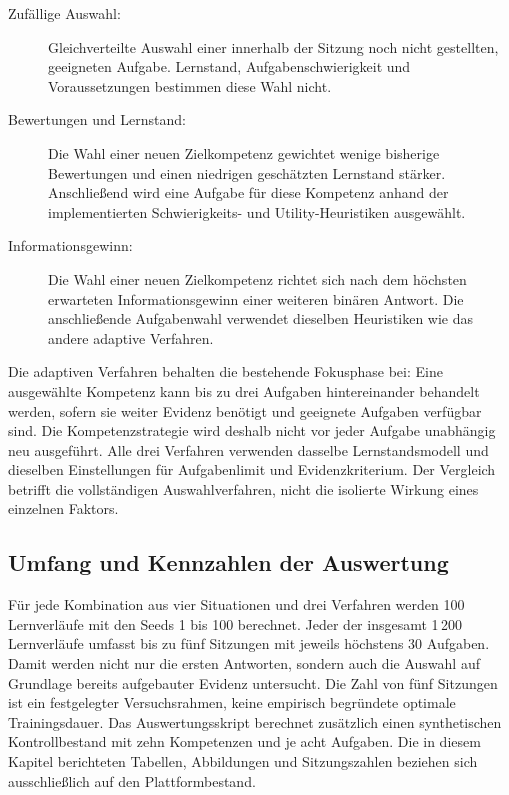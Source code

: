 \begin{description}
  \item[Zufällige Auswahl:] Gleichverteilte Auswahl einer innerhalb der
    Sitzung noch nicht gestellten, geeigneten Aufgabe. Lernstand,
    Aufgabenschwierigkeit und Voraussetzungen bestimmen diese Wahl nicht.
  \item[Bewertungen und Lernstand:] Die Wahl einer neuen Zielkompetenz
    gewichtet wenige bisherige Bewertungen und einen niedrigen geschätzten
    Lernstand stärker. Anschließend wird eine Aufgabe für diese Kompetenz
    anhand der implementierten Schwierigkeits- und Utility-Heuristiken
    ausgewählt.
  \item[Informationsgewinn:] Die Wahl einer neuen Zielkompetenz richtet
    sich nach dem höchsten erwarteten Informationsgewinn einer weiteren
    binären Antwort. Die anschließende Aufgabenwahl verwendet dieselben
    Heuristiken wie das andere adaptive Verfahren.
\end{description}

Die adaptiven Verfahren behalten die bestehende Fokusphase bei:
Eine ausgewählte Kompetenz kann bis zu drei Aufgaben hintereinander
behandelt werden, sofern sie weiter Evidenz benötigt und geeignete
Aufgaben verfügbar sind. Die Kompetenzstrategie wird deshalb nicht vor
jeder Aufgabe unabhängig neu ausgeführt. Alle drei Verfahren verwenden
dasselbe Lernstandsmodell und dieselben Einstellungen für Aufgabenlimit
und Evidenzkriterium. Der Vergleich betrifft die vollständigen
Auswahlverfahren, nicht die isolierte Wirkung eines einzelnen Faktors.

\subsection{Umfang und Kennzahlen der Auswertung}

Für jede Kombination aus vier Situationen und drei Verfahren werden
100 Lernverläufe mit den Seeds 1 bis 100 berechnet. Jeder der insgesamt
1\,200 Lernverläufe umfasst bis zu fünf Sitzungen mit jeweils höchstens
30 Aufgaben. Damit werden nicht nur die ersten Antworten, sondern auch
die Auswahl auf Grundlage bereits aufgebauter Evidenz untersucht.
Die Zahl von fünf Sitzungen ist ein festgelegter Versuchsrahmen,
keine empirisch begründete optimale Trainingsdauer.
Das Auswertungsskript berechnet zusätzlich einen synthetischen
Kontrollbestand mit zehn Kompetenzen und je acht Aufgaben.
Die in diesem Kapitel berichteten Tabellen, Abbildungen und
Sitzungszahlen beziehen sich ausschließlich auf den Plattformbestand.

